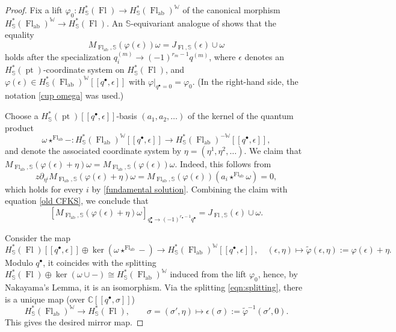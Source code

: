 \documentclass[a4paper,12pt]{amsart}
\numberwithin{equation}{section}
\theoremstyle{definition}
\newcommand{\C}{\mathbb{C}}
\newcommand{\bbS}{\mathbb{S}}
\newcommand{\W}{\mathbb{W}}
\newcommand{\pt}{\operatorname{pt}}
\newcommand{\Fl}{\operatorname{Fl}}
\newcommand{\FlG}{\operatorname{Fl}}
\newcommand{\FlT}{\operatorname{Fl}_{\operatorname{ab}}}
\begin{document}
\begin{proof}
    Fix a lift $\varphi_0\colon H^*_\bbS(\FlG)\to H^*_\bbS(\FlT)^\W$ of the canonical morphism $H^*_\bbS(\FlT)^\W\to H^*_\bbS(\FlG)$.
    An $\bbS$-equivariant analogue of \cite[Lemma 5.3.1]{CFKS} shows that the equality 
    \begin{equation}\label{old CFKS}
      M_{\FlT,\bbS}(\varphi(\epsilon))\omega = J_{\FlG,\bbS}(\epsilon) \cup \omega 
    \end{equation}
    holds after the specialization $q^{(m)}_i\to (-1)^{r_m-1} q^{(m)}$, where $\epsilon$ denotes an $H^*_{\bbS}(\pt)$-coordinate system on $H^*_\bbS(\Fl)$, and $\varphi(\epsilon)\in H^*_\bbS(\FlT)^\W[\![q^\bullet,\epsilon]\!]$ with $\varphi|_{q^\bullet=0} = \varphi_0$. (In the right-hand side, the notation \ref{cup omega} was used.)

    Choose a $H^*_{\bbS}(\pt)[\![q^\bullet,\epsilon]\!]$-basis $(a_1,a_2,\dots)$ of the kernel of the quantum product 
    \[
    \omega\star^{\FlT}-\colon H^*_\bbS(\FlT)^\W[\![q^\bullet,\epsilon]\!] \to H^*_\bbS(\FlT)^{-\W}[\![q^\bullet,\epsilon]\!], 
    \]
    and denote the associated coordinate system by $\eta=(\eta^1,\eta^2,\dots)$.
    We claim that $M_{\FlT,\bbS}(\varphi(\epsilon)+\eta)\omega=M_{\FlT,\bbS}(\varphi(\epsilon))\omega$. Indeed, this follows from
    \[
    z\partial_{\eta^i}M_{\FlT,\bbS}(\varphi(\epsilon)+\eta)\omega = M_{\FlT,\bbS}(\varphi(\epsilon)) (a_i\star^{\FlT}\omega)=0,
    \]
    which holds for every $i$ by \eqref{fundamental solution}.
    Combining the claim with equation \eqref{old CFKS}, we conclude that
    \[
    [M_{\FlT,\bbS}(\varphi(\epsilon)+\eta)\omega]_{q^\bullet_\bullet\to(-1)^{r_\bullet-1}q^\bullet} = J_{\Fl,\bbS}(\epsilon)\cup\omega.   
    \]
    
    Consider the map
    \begin{equation}\label{eqn:splitting}
        H^*_\bbS(\FlG)[\![q^\bullet,\epsilon]\!] \oplus \ker(\omega\star^{\FlT}-) \to H^*_\bbS(\FlT)^\W[\![q^\bullet,\epsilon]\!], \quad (\epsilon,\eta)\mapsto \widetilde{\varphi}(\epsilon,\eta) := \varphi(\epsilon)+\eta.
    \end{equation}
    Modulo $q^\bullet$, it coincides with the splitting $H^*_\bbS(\FlG)\oplus\ker(\omega\cup-)\cong H^*_\bbS(\FlT)^\W$ induced from the lift $\varphi_0$, hence, by Nakayama's Lemma, it is an isomorphism.
    Via the splitting \eqref{eqn:splitting}, there is a unique map (over $\C[\![q^\bullet,\sigma]\!]$)
    \[
    H^*_\bbS(\FlT)^\W \to H^*_\bbS(\FlG), \qquad \sigma = (\sigma',\eta) \mapsto \epsilon(\sigma):=\widetilde{\varphi}^{-1}(\sigma',0).
    \]
    This gives the desired mirror map.
\end{proof}
\end{document}
